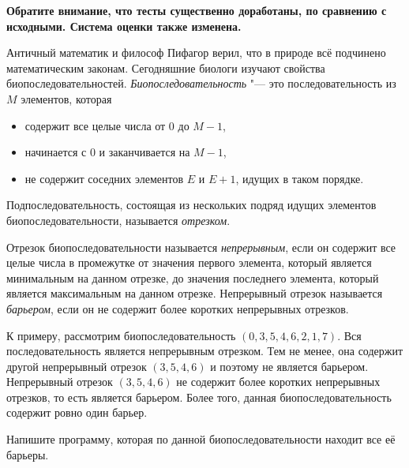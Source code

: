 {\bf Обратите внимание, что тесты существенно доработаны, по сравнению с исходными. Система оценки также изменена. }

Античный математик и философ Пифагор верил, что в природе всё подчинено математическим законам. Сегодняшние биологи изучают свойства биопоследовательностей.
\textit{Биопоследовательность} "--- это последовательность из $M$ элементов,
которая
\begin{itemize}
\item
содержит все целые числа от $0$ до $M - 1$,
\item
начинается с $0$ и заканчивается на $M - 1$,
\item
не содержит соседних элементов $E$ и $E + 1$, идущих в таком порядке.
\end{itemize}
Подпоследовательность, состоящая из нескольких подряд идущих элементов
биопоследовательности, называется \textit{отрезком}.

Отрезок биопоследовательности называется \textit{непрерывным},
если он содержит все целые числа в промежутке от значения первого элемента,
который является минимальным на данном отрезке, до значения
последнего элемента, который является максимальным на данном отрезке.
Непрерывный отрезок называется \textit{барьером}, если он не содержит
более коротких непрерывных отрезков.

К примеру, рассмотрим биопоследовательность $(0,3,5,4,6,2,1,7)$.
Вся последовательность является непрерывным отрезком.
Тем не менее, она содержит другой непрерывный отрезок $(3,5,4,6)$
и поэтому не является барьером.
Непрерывный отрезок $(3,5,4,6)$ не содержит более коротких непрерывных
отрезков, то есть является барьером. 
Более того, данная биопоследовательность содержит ровно один барьер.

Напишите программу, которая по данной биопоследовательности находит
все её барьеры.

